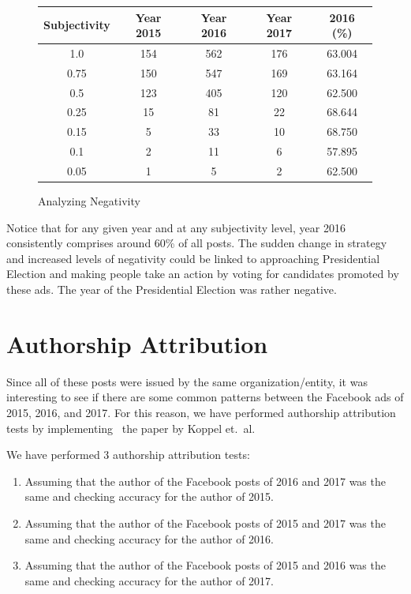 \documentclass{article}
\begin{document}
\begin{figure}[H]
  \centering
  \begin{tabular}{*{5}{c}}
    \toprule
    Subjectivity & Year 2015 & Year 2016 & Year 2017 & 2016 (\%)\\
    \midrule
    1.0  & 154 & 562 & 176 & 63.004\\
    \midrule
    0.75 & 150 & 547 & 169 & 63.164\\
    \midrule
    0.5  & 123 & 405 & 120 & 62.500\\
    \midrule
    0.25 & 15 & 81 & 22 & 68.644\\
    \midrule
    0.15 & 5 & 33 & 10 & 68.750\\
    \midrule
    0.1  & 2 & 11 & 6 & 57.895\\
    \midrule
    0.05 & 1 & 5 & 2 & 62.500\\
    \bottomrule
  \end{tabular}
  \caption{Analyzing Negativity}
\end{figure}

Notice that for any given year and at any subjectivity level, year 2016
consistently comprises around 60\% of all posts. The sudden change in strategy
and increased levels of negativity could be linked to approaching Presidential
Election and making people take an action by voting for candidates promoted by
these ads. The year of the Presidential Election was rather negative.


\section{Authorship Attribution}

Since all of these posts were issued by the same organization/entity, it was
interesting to see if there are some common patterns between the Facebook ads
of 2015, 2016, and 2017. For this reason, we have performed authorship
attribution tests by implementing~\cite{koppel11} the paper by Koppel et.~al.

\medskip

We have performed 3 authorship attribution tests:

\begin{enumerate}
  \item Assuming that the author of the Facebook posts of 2016 and 2017 was the
        same and checking accuracy for the author of 2015.

  \item Assuming that the author of the Facebook posts of 2015 and 2017 was the
        same and checking accuracy for the author of 2016.

  \item Assuming that the author of the Facebook posts of 2015 and 2016 was the
        same and checking accuracy for the author of 2017.
\end{enumerate}
\end{document}
